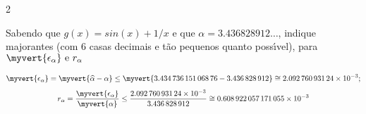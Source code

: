 \documentclass["CN_A-Exercises_Resolutions.tex"]{subfiles}
\begin{document}
\begin{questionBox}2{} %

  Sabendo que \(g(x) = sin(x) + 1/x\) e que \(\alpha = 3.436828912\dots\), indique majorantes (com 6 casas decimais e tão pequenos quanto possı́vel), para \(\myvert{\epsilon_\alpha}\text{ e }r_\alpha\)

  \answer{}


  \begin{gather*}
    \myvert{\epsilon_\alpha} 
    = \myvert{\widehat{\alpha}-\alpha}
    \leq \myvert{\num{3.43473615106876}-\num{3.436828912}}
    \cong\num{2.09276093124e-3}
    ; \\[1ex]
    r_{\alpha}
    = \frac
    { \myvert{\epsilon_\alpha} }
    { \myvert{\alpha} }
    \leq
    \frac{\num{2.09276093124e-3}}
    {\num{3.436828912}}
    \cong
    \num{0.608922057171055e-3}
  \end{gather*}

\end{questionBox}
\end{document}

